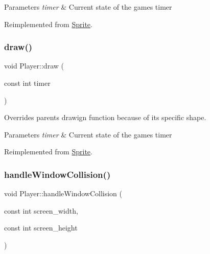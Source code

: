 \begin{DoxyParams}{Parameters}
{\em timer} & Current state of the game\textquotesingle{}s timer \\
\hline
\end{DoxyParams}


Reimplemented from \hyperlink{classSprite_a280f80ec30e7d237e3d1380dab27dd31}{Sprite}.

\mbox{\label{classPlayer_a856a5c64a431661946ba01b84c969289}} 
\subsubsection{\texorpdfstring{draw()}{draw()}}
{\footnotesize\ttfamily void Player\+::draw (\begin{DoxyParamCaption}\item[{const int}]{timer }\end{DoxyParamCaption})\hspace{0.3cm}{\ttfamily [virtual]}}

Overrides parent\textquotesingle{}s drawign function because of it\textquotesingle{}s specific shape.


\begin{DoxyParams}{Parameters}
{\em timer} & Current state of the game\textquotesingle{}s timer \\
\hline
\end{DoxyParams}


Reimplemented from \hyperlink{classSprite_aa41512617e8a1626bade15cbbdfb3f79}{Sprite}.

\mbox{\label{classPlayer_a0646b0f8b1db49816338d0be18175fbe}} 
\subsubsection{\texorpdfstring{handle\+Window\+Collision()}{handleWindowCollision()}}
{\footnotesize\ttfamily void Player\+::handle\+Window\+Collision (\begin{DoxyParamCaption}\item[{const int}]{screen\+\_\+width,  }\item[{const int}]{screen\+\_\+height }\end{DoxyParamCaption})\hspace{0.3cm}{\ttfamily [virtual]}}

